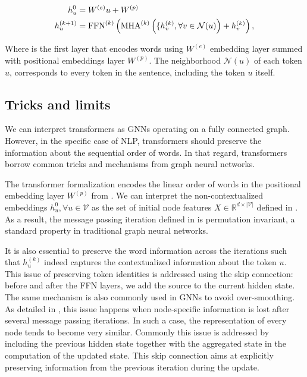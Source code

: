 {\small
\begin{align}
    h^0_u &= W^{(e)} u + W^{(p)} \labeq{update-aggregate-transformers-emb}\\
    h^{(k+1)}_u &= \text{FFN}^{(k)}\left(\text{MHA}^{(k)}\left(\{h_v^{(k)}, \forall v \in \mathcal{N}(u) \right) + h_v^{(k)}\right), \labeq{update-aggregate-transformers}
\end{align}}

Where  is the first layer that encodes words using $W^{(e)}$ embedding layer summed with positional embeddings layer $W^{(p)}$. The neighborhood $\mathcal{N}(u)$ of each token $u$, corresponds to every token in the sentence, including the token $u$ itself.

\subsection{Tricks and limits}

We can interpret transformers as GNNs operating on a fully connected graph. However, in the specific case of NLP, transformers should preserve the information about the sequential order of words. In that regard, transformers borrow common tricks and mechanisms from graph neural networks.

The transformer formalization encodes the linear order of words in the positional embedding layer $W^{(p)}$ from  . We can interpret the non-contextualized embeddings $h^0_u, \forall u \in \mathcal{V}$  as the set of initial node features $X \in \mathbb{R}^{d \times |\mathcal{V}|}$ defined in . As a result, the message passing iteration defined in  is permutation invariant, a standard property in traditional graph neural networks.

It is also essential to preserve the word information across the iterations such that $h^{(k)}_u$ indeed captures the contextualized information about the token $u$. This issue of preserving token identities is addressed using the skip connection: before and after the FFN layers, we add the source to the current hidden state. The same mechanism is also commonly used in GNNs to avoid over-smoothing. As detailed in \textcite{hamilton_2020}, this issue happens when node-specific information is lost after several message passing iterations. In such a case, the representation of every node tends to become very similar. Commonly this issue is addressed by including the previous hidden state together with the aggregated state in the computation of the updated state.
This skip connection aims at explicitly preserving information from the previous iteration during the update.

